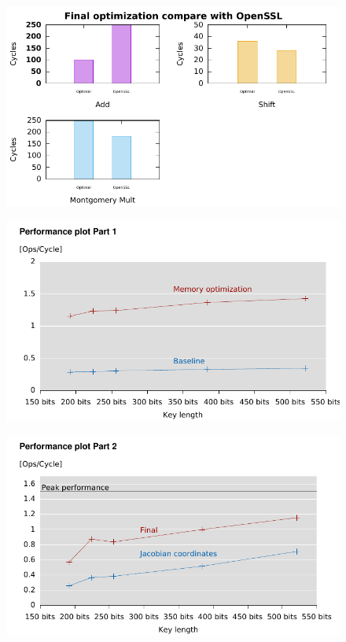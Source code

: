 \begin{frame}
\begin{figure}\flushleft		
\includegraphics[scale=0.9, trim={0 0 0 0}]{openssl}		
\end{figure}
\end{frame}
\begin{frame}
\begin{figure}\flushleft		
\includegraphics[scale=0.9, trim={0 0 0 0}]{perfplot1}		
\end{figure}
\end{frame}
\begin{frame}
\begin{figure}\flushleft		
\includegraphics[scale=0.9, trim={0 0 0 0}]{perfplot2}		
\end{figure}
\end{frame}
